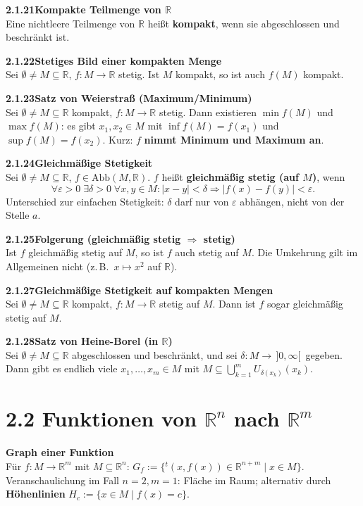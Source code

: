 \documentclass[a4paper,12pt]{article}
\newcommand{\gentry}[3]{%
  \noindent\textbf{#1\quad #2}\nopagebreak\\[0.2em]
  #3\par\smallskip
}
\begin{document}
\gentry{2.1.21}{Kompakte Teilmenge von $\mathbb{R}$}{%
  Eine nichtleere Teilmenge von $\mathbb{R}$ heißt \textbf{kompakt}, wenn sie
  abgeschlossen und beschränkt ist.
}

\gentry{2.1.22}{Stetiges Bild einer kompakten Menge}{%
  Sei $\emptyset \neq M \subseteq \mathbb{R}$, $f: M \to \mathbb{R}$ stetig.
  Ist $M$ kompakt, so ist auch $f(M)$ kompakt.
}

\gentry{2.1.23}{Satz von Weierstraß (Maximum/Minimum)}{%
  Sei $\emptyset \neq M \subseteq \mathbb{R}$ kompakt, $f: M \to \mathbb{R}$ stetig.
  Dann existieren $\min f(M)$ und $\max f(M)$: es gibt $x_1, x_2 \in M$ mit
  $\inf f(M) = f(x_1)$ und $\sup f(M) = f(x_2)$. Kurz: $f$ \textbf{nimmt
  Minimum und Maximum an}.
}

\gentry{2.1.24}{Gleichmäßige Stetigkeit}{%
  Sei $\emptyset \neq M \subseteq \mathbb{R}$, $f \in \mathrm{Abb}(M, \mathbb{R})$.
  $f$ heißt \textbf{gleichmäßig stetig (auf $M$)}, wenn
  \[
    \forall \varepsilon > 0\;\exists \delta > 0\;\forall x, y \in M:
    |x - y| < \delta \Rightarrow |f(x) - f(y)| < \varepsilon.
  \]
  Unterschied zur einfachen Stetigkeit: $\delta$ darf nur von $\varepsilon$ abhängen,
  nicht von der Stelle $a$.
}

\gentry{2.1.25}{Folgerung (gleichmäßig stetig $\Rightarrow$ stetig)}{%
  Ist $f$ gleichmäßig stetig auf $M$, so ist $f$ auch stetig auf $M$. Die
  Umkehrung gilt im Allgemeinen nicht (z.\,B.\ $x \mapsto x^2$ auf $\mathbb{R}$).
}

\gentry{2.1.27}{Gleichmäßige Stetigkeit auf kompakten Mengen}{%
  Sei $\emptyset \neq M \subseteq \mathbb{R}$ kompakt, $f: M \to \mathbb{R}$ stetig
  auf $M$. Dann ist $f$ sogar gleichmäßig stetig auf $M$.
}

\gentry{2.1.28}{Satz von Heine-Borel (in $\mathbb{R}$)}{%
  Sei $\emptyset \neq M \subseteq \mathbb{R}$ abgeschlossen und beschränkt,
  und sei $\delta: M \to \,]0, \infty[\,$ gegeben. Dann gibt es endlich viele
  $x_1, \ldots, x_m \in M$ mit
  $M \subseteq \bigcup_{k=1}^m U_{\delta(x_k)}(x_k)$.
}

\section*{2.2 \quad Funktionen von $\mathbb{R}^n$ nach $\mathbb{R}^m$}

\gentry{}{Graph einer Funktion}{%
  Für $f: M \to \mathbb{R}^m$ mit $M \subseteq \mathbb{R}^n$:
  $G_f := \{{}^t(x, f(x)) \in \mathbb{R}^{n+m} \mid x \in M\}$.
  Veranschaulichung im Fall $n = 2, m = 1$: Fläche im Raum; alternativ durch
  \textbf{Höhenlinien} $H_c := \{x \in M \mid f(x) = c\}$.
}
\end{document}

